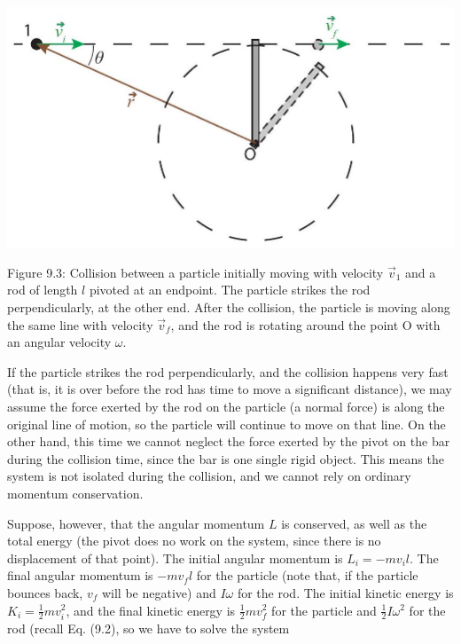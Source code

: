 \documentclass[10pt]{article}
\begin{document}
\begin{center}
\includegraphics[max width=\textwidth]{2024_09_14_9969b06773f10b6936e8g-214}
\end{center}

Figure 9.3: Collision between a particle initially moving with velocity $\vec{v}_{1}$ and a rod of length $l$ pivoted at an endpoint. The particle strikes the rod perpendicularly, at the other end. After the collision, the particle is moving along the same line with velocity $\vec{v}_{f}$, and the rod is rotating around the point O with an angular velocity $\omega$.

If the particle strikes the rod perpendicularly, and the collision happens very fast (that is, it is over before the rod has time to move a significant distance), we may assume the force exerted by the rod on the particle (a normal force) is along the original line of motion, so the particle will continue to move on that line. On the other hand, this time we cannot neglect the force exerted by the pivot on the bar during the collision time, since the bar is one single rigid object. This means the system is not isolated during the collision, and we cannot rely on ordinary momentum conservation.

Suppose, however, that the angular momentum $L$ is conserved, as well as the total energy (the pivot does no work on the system, since there is no displacement of that point). The initial angular momentum is $L_{i}=-m v_{i} l$. The final angular momentum is $-m v_{f} l$ for the particle (note that, if the particle bounces back, $v_{f}$ will be negative) and $I \omega$ for the rod. The initial kinetic energy is $K_{i}=\frac{1}{2} m v_{i}^{2}$, and the final kinetic energy is $\frac{1}{2} m v_{f}^{2}$ for the particle and $\frac{1}{2} I \omega^{2}$ for the rod (recall Eq. (9.2), so we have to solve the system
\end{document}

